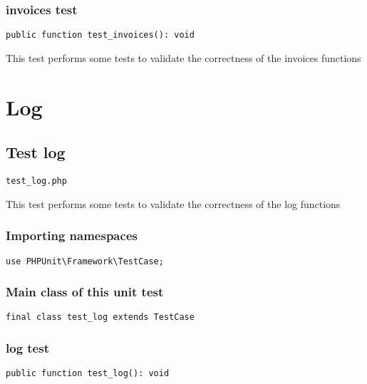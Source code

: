 \documentclass[a4paper]{article}
\begin{document}
\subsubsection{invoices test}

\begin{lstlisting}
public function test_invoices(): void
\end{lstlisting}

This test performs some tests to validate the correctness
of the invoices functions


\hypertarget{toc285}{}
\section{Log}

\hypertarget{toc286}{}
\subsection{Test log}

\begin{lstlisting}
test_log.php
\end{lstlisting}

This test performs some tests to validate the correctness
of the log functions

\hypertarget{toc287}{}
\subsubsection{Importing namespaces}

\begin{lstlisting}
use PHPUnit\Framework\TestCase;
\end{lstlisting}

\hypertarget{toc288}{}
\subsubsection{Main class of this unit test}

\begin{lstlisting}
final class test_log extends TestCase
\end{lstlisting}

\hypertarget{toc289}{}
\subsubsection{log test}

\begin{lstlisting}
public function test_log(): void
\end{lstlisting}
\end{document}
